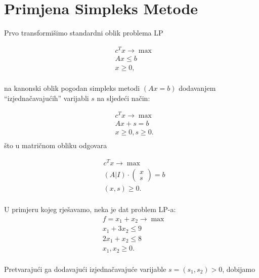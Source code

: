 \documentclass[a4paper, utf8, 11pt, colorlinks]{book}
\begin{document}
\section{Primjena Simpleks Metode}
Prvo transformišimo standardni oblik problema LP
 
  \begin{align}
    & c^T x \rightarrow \max \\
    & Ax \leq b \\
    & x \geq 0,\\
\end{align}
 
na kanonski oblik pogodan simpleks metodi $(A {x} = b)$ dodavanjem ``izjednačavajućih'' varijabli $s$ na sljedeći način:
 
\begin{align}
    & c^T x \rightarrow \max \\
    & Ax + s =  b \\
    & x \geq 0, s \geq 0. \\
\end{align}
što u matričnom obliku odgovara 

\begin{align}
    & c^T x \rightarrow \max \\
    & (A | I) \cdot \left (\begin{array}{c}
         x  \\
         s 
    \end{array} \right ) =  b \\
    & (x, s) \geq 0. \\
\end{align} 

U primjeru kojeg rješavamo, neka je dat problem LP-a:
\begin{align*}
    &f= x_1 + x_2 \rightarrow \max \nonumber \\
    & x_1 + 3 x_2 \leq 9 \nonumber \\
    & 2x_1 + x_2 \leq 8  \nonumber \\
    & x_1, x_2 \geq 0. \nonumber \\
\end{align*}
 
 Pretvarajući ga dodavajući izjednačavajuće varijable $s = (s_1, s_2)>0$, dobijamo 
\end{document}
